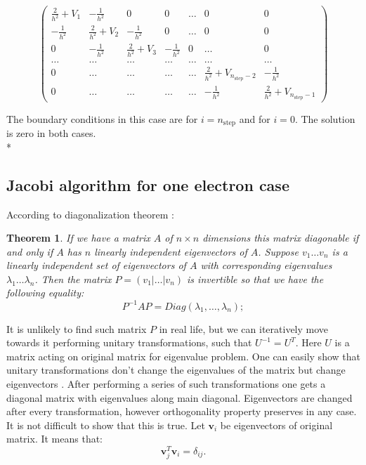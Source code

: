 \documentclass[10pt]{article}
\newtheorem*{theorem}{Theorem}
\begin{document}
\[
\left( 
\begin{array}{ccccccc}
\frac{2}{h^{2}}+V_{1} & -\frac{1}{h^{2}} & 0 & 0 & \dots  & 0 & 0 \\ 
-\frac{1}{h^{2}} & \frac{2}{h^{2}}+V_{2} & -\frac{1}{h^{2}} & 0 & \dots  & 0
& 0 \\ 
0 & -\frac{1}{h^{2}} & \frac{2}{h^{2}}+V_{3} & -\frac{1}{h^{2}} & 0 & \dots 
& 0 \\ 
\dots  & \dots  & \dots  & \dots  & \dots  & \dots  & \dots  \\ 
0 & \dots  & \dots  & \dots  & \dots  & \frac{2}{h^{2}}+V_{n_{\mathrm{step}%
	}-2} & -\frac{1}{h^{2}} \\ 
0 & \dots  & \dots  & \dots  & \dots  & -\frac{1}{h^{2}} & \frac{2}{h^{2}}%
+V_{n_{\mathrm{step}}-1}%
\end{array}%
\right) 
\]

The boundary conditions in this case are for $i=n_{\mathrm{step}}$ and for $%
i=0$. The solution is zero in both cases.\\*
\subsection{Jacobi algorithm for one electron case}
According to diagonalization theorem :
\begin{theorem}

If we have a matrix $ A $ of $ n \times n$ dimensions this matrix diagonable if and only if $ A $ has $ n $ linearly independent eigenvectors of $ A $. Suppose $ v_{1} \dots v_{n} $ is a linearly independent set of eigenvectors of $ A $ with corresponding eigenvalues $ \lambda_{1} \dots \lambda_{n} $. Then the matrix $ P = (v_{1} |\dots |v_{n}) $ is invertible so that we have the following equality:
\begin{equation}
P^{-1}AP=Diag(\lambda_{1},\dots,\lambda_{n});
\end{equation}
\end{theorem}
It is unlikely to find such matrix $ P$ in real life, but we can iteratively move towards it performing unitary transformations, such that $ U^{-1}=U^{T}$. Here $ U $ is a matrix acting on original matrix for eigenvalue problem. One can easily show that unitary transformations don't change the eigenvalues of the matrix but change eigenvectors \cite{one}. After performing a series of such transformations one gets a diagonal matrix with eigenvalues along main diagonal. Eigenvectors are changed after every transformation, however orthogonality property preserves in any case. It is not difficult to show that this is true.
Let $\textbf{v}_{i}  $ be eigenvectors of original matrix. It means that:
\begin{equation}
\mathbf{v}_j^T\mathbf{v}_i = \delta_{ij}.
\end{equation}
\end{document}
